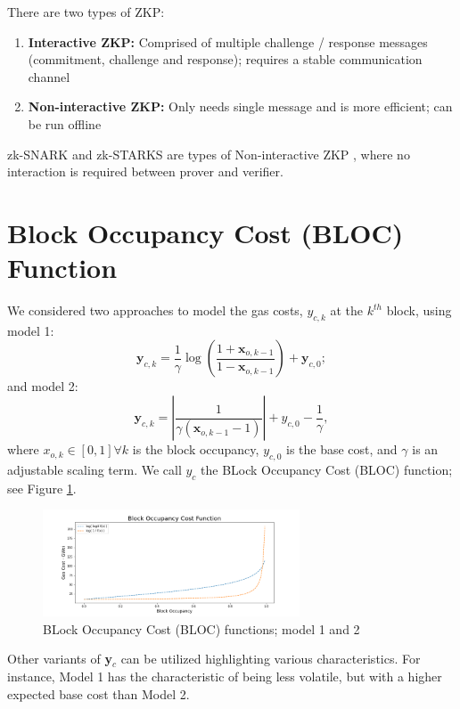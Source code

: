 \documentclass[peerreview]{ieeesyscoin}
\begin{document}
There are two types of ZKP:

\begin{enumerate}
\item \textbf{Interactive ZKP:} Comprised of multiple challenge / response messages (commitment, challenge and response); requires a stable communication channel
\item \textbf{Non-interactive ZKP:} Only needs single message and is more efficient; can be run offline
\end{enumerate}
zk-SNARK and zk-STARKS are types of Non-interactive ZKP , where no interaction is required between prover and verifier.

\section{Block Occupancy Cost (BLOC) Function}

We considered two approaches to model the gas costs, $y_{c,k}$ at the $k^{th}$ block, using model 1:
\begin{equation}
\mathbf{y}_{c,k} = \dfrac{1}{\gamma}\log\left(\dfrac{1+\mathbf{x}_{o,k-1}}{1-\mathbf{x}_{o,k-1}}\right) + \mathbf{y}_{c,0};
\end{equation}
and model 2:
\begin{equation}
\mathbf{y}_{c,k} = \left| \dfrac{1}{\gamma(\mathbf{x}_{o,k-1}-1)} \right| + y_{c,0} - \dfrac{1}{\gamma},
\end{equation}
where $x_{o,k} \in [0,1] \forall k$ is the block occupancy, $y_{c,0}$ is the base cost, and $\gamma$ is an adjustable scaling term. We call $y_{c}$ the BLock Occupancy Cost (BLOC) function; see Figure \ref{fig:bloc}.

\begin{figure}[h!]
\includegraphics[width=3in]{img/blk_occupancy_cost_fn.png}
\caption{BLock Occupancy Cost (BLOC) functions; model 1 and 2} 
\label{fig:bloc}
\end{figure} 

Other variants of \textbf{y}$_{c}$ can be utilized highlighting various characteristics. For instance, Model 1 has the characteristic of being less volatile, but with a higher expected base cost than Model 2.
\end{document}
